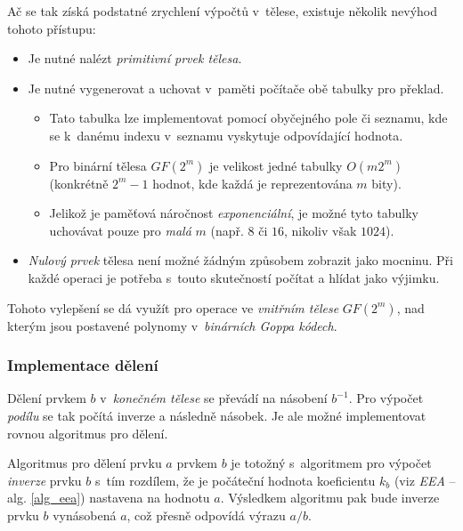 \documentclass[thesis=M,czech,hidelinks]{FITthesis}[2012/06/26]
\newcommand{\0}{{\textcolor[gray]{0.80}{0}}}
\begin{document}
Ač se tak získá podstatné zrychlení výpočtů v~tělese, existuje několik nevýhod
tohoto přístupu:

\begin{itemize}
    \item Je nutné nalézt \emph{primitivní prvek tělesa}.

    \item Je nutné vygenerovat a uchovat v~paměti počítače obě tabulky pro
        překlad.
        \begin{itemize}
            \item Tato tabulka lze implementovat pomocí obyčejného pole či
                seznamu, kde se k~danému indexu v~seznamu vyskytuje odpovídající
                hodnota.
            \item Pro binární  tělesa $GF(2^m)$ je velikost jedné tabulky
                $O(m 2^m)$ (konkrétně $2^m - 1$ hodnot, kde každá je
                reprezentována $m$ bity).
            \item Jelikož je paměťová náročnost \emph{exponenciální}, je
                možné tyto tabulky uchovávat pouze pro \emph{malá} $m$ (např.
                $8$ či $16$, nikoliv však $1024$).
        \end{itemize}

    \item \emph{Nulový prvek} tělesa není možné žádným způsobem zobrazit jako
        mocninu. Při každé operaci je potřeba s~touto skutečností počítat
        a hlídat jako výjimku.

\end{itemize}


Tohoto vylepšení se dá využít pro operace ve \emph{vnitřním tělese}
$GF(2^m)$, nad kterým jsou postavené polynomy v~\emph{binárních Goppa kódech}.


\subsubsection{Implementace dělení}
Dělení prvkem $b$ v~\emph{konečném tělese} se převádí na násobení $b^{-1}$. Pro
výpočet \emph{podílu} se tak počítá inverze a následně násobek. Je ale možné
implementovat rovnou algoritmus pro dělení.

Algoritmus pro dělení prvku $a$ prvkem $b$ je totožný s~algoritmem pro výpočet
\emph{inverze} prvku $b$ s~tím rozdílem, že je počáteční hodnota koeficientu
$k_b$ (viz \emph{EEA} -- alg. \ref{alg_eea}) nastavena na hodnotu $a$.
%
Výsledkem algoritmu pak bude inverze prvku $b$ vynásobená $a$, což přesně
odpovídá výrazu $a/b$.
\end{document}
